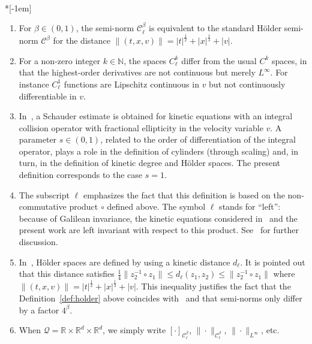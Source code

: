 \documentclass[AHL,Unicode,longabstracts,published]{cedram}
\newcommand{\N}{\mathbb{N}}
\newcommand{\R}{\mathbb{R}}
\newcommand{\cC}{\mathcal{C}}
\newcommand{\cQ}{\mathcal{Q}}
\begin{document}
\begin{rema}\ \\*[-1em]
\begin{enumerate}
\item \label{rema2.3.1} For $\beta \in (0,1)$, the semi-norm $\cC^\beta_\ell$ is equivalent to the standard H\"older semi-norm $\cC^\beta$ for the distance $\|(t,x,v)\|=|t|^{\frac12} + |x|^{\frac13} + |v|$.

\item \label{rema2.3.2}For a non-zero integer $k \in \N$, the spaces $C^k_\ell$ differ from the usual $C^k$ spaces, in that the highest-order derivatives are not continuous but merely $L^\infty$. For instance $C^1_\ell$ functions are Lipschitz continuous in $v$ but not continuously differentiable in $v$.


\item \label{rema2.3.3}In~\cite{imbert2018schauder}, a Schauder estimate is obtained for kinetic equations with an integral collision operator with fractional ellipticity in the velocity variable $v$. A parameter $s \in (0,1)$, related to the order of differentiation of the integral operator, plays a role in the definition of cylinders (through scaling) and, in turn, in the definition of kinetic degree and H\"older spaces. The present definition corresponds to the case $s=1$.

\item \label{rema2.3.4}The subscript $\ell$ emphasizes the fact that this definition is based on the non-commutative product $\circ$ defined above. The symbol $\ell$ stands for ``left'': because of Galilean invariance, the kinetic equations considered in~\cite{imbert2018schauder} and the present work are left invariant with respect to this product. See~\cite{imbert2018schauder} for further discussion.

\item \label{rema2.3.5}In~\cite{imbert2018schauder}, H\"older spaces are defined by using a kinetic distance $d_\ell$. It is pointed out that this distance satisfies $\frac14 \|z_2^{-1} \circ z_1\| \le d_\ell (z_1,z_2) \le
\|z_2^{-1} \circ z_1\|$ where $\|(t,x,v)\|=|t|^{\frac12} + |x|^{\frac13} + |v|$. This inequality justifies the fact that the Definition~\ref{def:holder} above coincides with~\cite[Definition~2.3]{imbert2018schauder} and that semi-norms only differ by a factor $4^\beta$.

\item \label{rema2.3.6}When $\cQ = \R \times \R^d \times \R^d$, we simply write $[\cdot]_{\cC_\ell^{\beta}}$, $\|\cdot\|_{\cC_\ell^{\beta}}$, $\|\cdot\|_{L^\infty}$, etc.
\end{enumerate}
\end{rema}
\end{document}
